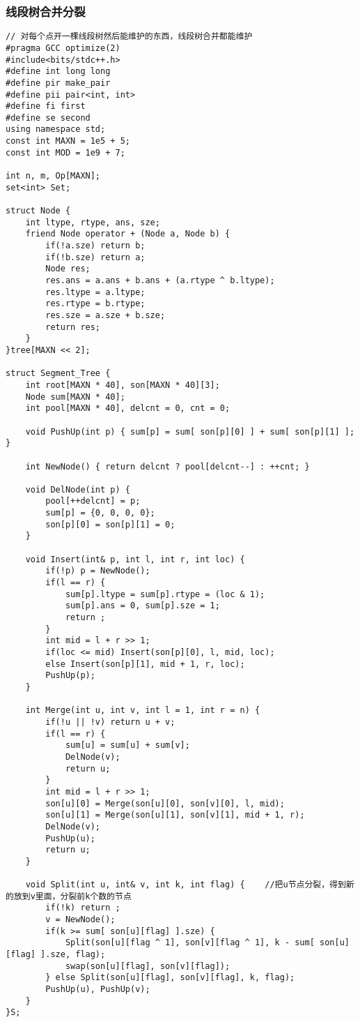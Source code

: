 \subsubsection{线段树合并分裂}
\begin{lstlisting}
// 对每个点开一棵线段树然后能维护的东西，线段树合并都能维护
#pragma GCC optimize(2)
#include<bits/stdc++.h>
#define int long long
#define pir make_pair
#define pii pair<int, int>
#define fi first
#define se second
using namespace std;
const int MAXN = 1e5 + 5;
const int MOD = 1e9 + 7;

int n, m, Op[MAXN];
set<int> Set;

struct Node {
	int ltype, rtype, ans, sze;
	friend Node operator + (Node a, Node b) {
		if(!a.sze) return b;
		if(!b.sze) return a;
		Node res;
		res.ans = a.ans + b.ans + (a.rtype ^ b.ltype);
		res.ltype = a.ltype;
		res.rtype = b.rtype;
		res.sze = a.sze + b.sze;
		return res;
	}
}tree[MAXN << 2];

struct Segment_Tree {
	int root[MAXN * 40], son[MAXN * 40][3];
	Node sum[MAXN * 40];
	int pool[MAXN * 40], delcnt = 0, cnt = 0;
	
	void PushUp(int p) { sum[p] = sum[ son[p][0] ] + sum[ son[p][1] ]; }
	
	int NewNode() { return delcnt ? pool[delcnt--] : ++cnt; }
	
	void DelNode(int p) {
		pool[++delcnt] = p;
		sum[p] = {0, 0, 0, 0};
		son[p][0] = son[p][1] = 0;
	}
	
	void Insert(int& p, int l, int r, int loc) {
		if(!p) p = NewNode();
		if(l == r) {
			sum[p].ltype = sum[p].rtype = (loc & 1);
			sum[p].ans = 0, sum[p].sze = 1;
			return ;
		}
		int mid = l + r >> 1;
		if(loc <= mid) Insert(son[p][0], l, mid, loc);
		else Insert(son[p][1], mid + 1, r, loc);
		PushUp(p);
	}
	
	int Merge(int u, int v, int l = 1, int r = n) {
		if(!u || !v) return u + v;
		if(l == r) {
			sum[u] = sum[u] + sum[v];
			DelNode(v); 
			return u;
		}
		int mid = l + r >> 1;
		son[u][0] = Merge(son[u][0], son[v][0], l, mid);
		son[u][1] = Merge(son[u][1], son[v][1], mid + 1, r);
		DelNode(v);
		PushUp(u);
		return u;
	}
	
	void Split(int u, int& v, int k, int flag) {	//把u节点分裂，得到新的放到v里面，分裂前k个数的节点
		if(!k) return ;
		v = NewNode();
		if(k >= sum[ son[u][flag] ].sze) {
			Split(son[u][flag ^ 1], son[v][flag ^ 1], k - sum[ son[u][flag] ].sze, flag);
			swap(son[u][flag], son[v][flag]);
		} else Split(son[u][flag], son[v][flag], k, flag);
		PushUp(u), PushUp(v);
	}
}S;


\end{lstlisting}

